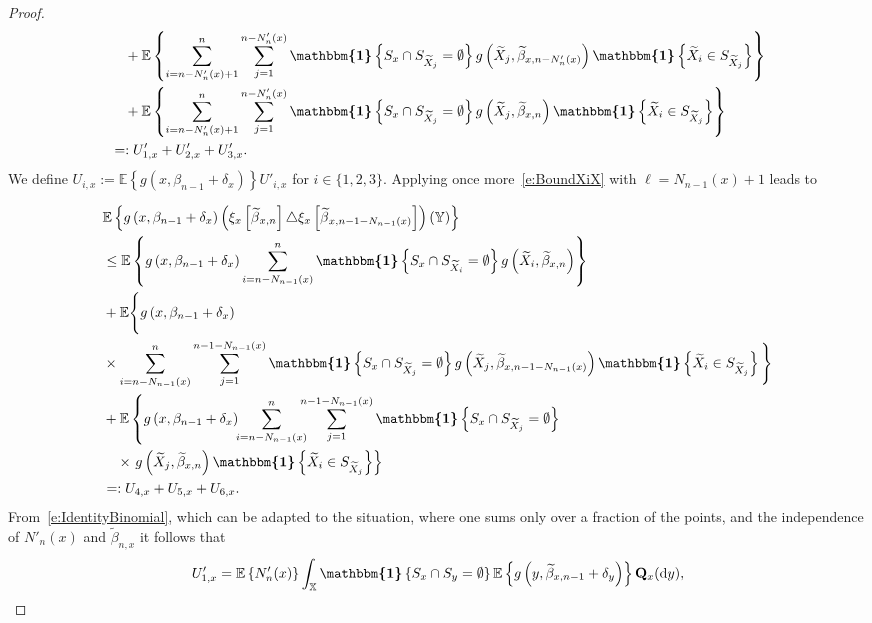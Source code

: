 \documentclass[AHL,Unicode,longabstracts]{cedram}
\newcommand{\bQ}{\mathbf{Q}}
\newcommand*\X{\mathbb{X}}
\newcommand*\Y{\mathbb{Y}}
\newcommand{\E}{\mathbb{E}}
\newcommand*\md{\mathrm{d}}
\newcommand{\mean}[1] {\E\left\{{#1}\right\}}
\newcommand{\ind}{\boldsymbol{\mathbbm{1}}}
\let\oldtilde\tilde
\renewcommand*{\tilde}[1]{\mathchoice{\widetilde{#1}}{\widetilde{#1}}{\oldtilde{#1}}{\oldtilde{#1}}}
\begin{document}
\begin{proof}
\begin{multline*}
\begin{aligned}
& \quad + \mean{\sum_{i=n-N_n'(x)+1}^n \sum_{j=1}^{n-N_n'(x)} \ind\left\{S_x\cap S_{\widetilde{X}_j} = \emptyset\right\} g\left(\widetilde{X}_j,\widetilde{\beta}_{x,n-N_n'(x)}\right) \ind\left\{\widetilde{X}_i\in S_{\widetilde{X}_j}\right\}} \\
& \quad + \mean{\sum_{i=n-N_n'(x)+1}^n \sum_{j=1}^{n-N_n'(x)} \ind\left\{S_x\cap S_{\widetilde{X}_j} = \emptyset\right\} g\left(\widetilde{X}_j,\widetilde{\beta}_{x,n}\right) \ind\left
\{\widetilde{X}_i \in S_{\widetilde{X}_j}\right\}} \\
& =: U'_{1,x}+U'_{2,x}+U'_{3,x}.
\end{aligned}
\end{multline*}
We define $U_{i,x}:=\mean{g(x,\beta_{n-1}+\delta_x)} U'_{i,x}$ for $i\in\{1,2,3\}$. Applying once more~\eqref{e:BoundXiX} {with $\ell=N_{n-1}(x)+1$} leads to

\begin{align*}
\mkern-35mu & \mean{g\left(x,\beta_{n-1}+\delta_x\right) \left(\xi_x\left[\tilde{\beta}_{x,n}\right] \triangle \xi_x\left[\tilde{\beta}_{x,n-1-N_{n-1}(x)}\right]\right)(\Y) }\\
& \leq \mean{g\left(x,\beta_{n-1}+\delta_x\right) \sum_{i=n-N_{n-1}(x)}^n \ind\left\{S_x\cap S_{\widetilde{X}_i}=\emptyset \right\} g\left(\widetilde{X}_i,\widetilde{\beta}_{x,n}\right) } \\
&+ \E\Bigg\{g\left(x,\beta_{n-1}+\delta_x\right)\\
&\times \sum_{i=n-N_{n-1}(x)}^n \sum_{j=1}^{n-1-N_{n-1}(x)} \ind\left\{S_x\cap S_{\widetilde{X}_j} =\emptyset\right\} g\left(\widetilde{X}_j,\widetilde{\beta}_{x,n-1-N_{n-1}(x)}\right) \ind\left\{\widetilde{X}_i \in S_{\widetilde{X}_j} \right\} \Bigg\} \\
&+ \E\left\{g\left(x,\beta_{n-1}+\delta_x\right)\!\! \sum_{i=n-N_{n-1}(x)}^n \!\!\!\!\sum_{j=1}^{n-1-N_{n-1}(x)} \ind\left\{S_x\cap S_{\widetilde{X}_j}=\emptyset \right\}\right. \\
&\quad\times\left. g\left(\widetilde{X}_j,\widetilde{\beta}_{x,n}\right) \ind\left\{\widetilde{X}_i \in S_{\widetilde{X}_j} \right\} \right\} \\
& =: U_{4,x} + U_{5,x} + U_{6,x}.
\end{align*}
From~\eqref{e:IdentityBinomial}, which can be adapted to the situation, where one sums only over a fraction of the points, and the independence of $N'_n(x)$ and $\widetilde{\beta}_{n,x}$ it follows that
\[
U'_{1,x} =\mean{N_n'(x)} \int_{\X} \ind\left\{S_x\cap S_y=\emptyset\right\} \mean{g\left(y,\widetilde{\beta}_{x,n-1}+\delta_y\right)} \bQ_x(\md y),
\]
\vspace{10pt}


\end{proof}
\end{document}
